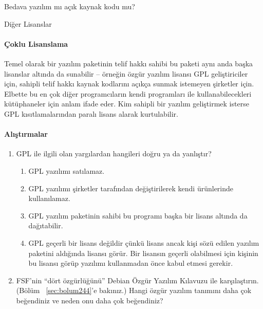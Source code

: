 \begin{section}{Bedava yazılım mı açık kaynak kodu mu?}
\begin{subsection}{Diğer Lisanslar}
\paragraph{Çoklu Lisanslama}{Temel olarak bir yazılım paketinin telif hakkı sahibi bu paketi aynı anda başka lisanslar altında da sunabilir – örneğin özgür yazılım lisansı GPL geliştiriciler için, sahipli telif hakkı kaynak kodlarını açıkça sunmak istemeyen şirketler için. Elbette bu en çok diğer programcıların kendi programları ile kullanabilecekleri kütüphaneler için anlam ifade eder. Kim sahipli bir yazılım geliştirmek isterse GPL kısıtlamalarından paralı lisans alarak kurtulabilir.}
\paragraph{{\Huge{\PencilLeftDown}}Alıştırmalar}{
\begin{enumerate}
 \item GPL ile ilgili olan yargılardan hangileri doğru ya da yanlıştır?
 \begin{enumerate}
 \item GPL yazılımı satılamaz.
 \item GPL yazılımı şirketler tarafından değiştirilerek kendi ürünlerinde kullanılamaz.
 \item GPL yazılım paketinin sahibi bu programı başka bir lisans altında da dağıtabilir.
 \item GPL geçerli bir lisans değildir çünkü lisans ancak kişi sözü edilen yazılım paketini aldığında lisansı görür. Bir lisansın geçerli olabilmesi için kişinin bu lisansı görüp yazılımı kullanmadan önce kabul etmesi gerekir.
 \end{enumerate}
 \item FSF'nin “dört özgürlüğünü” Debian Özgür Yazılım Kılavuzu ile karşılaştırın. (Bölüm ~\ref{sec:bolum244}'e bakınız.) Hangi özgür yazılım tanımını daha çok beğendiniz ve neden onu daha çok beğendiniz?
\end{enumerate}}
\end{subsection}
\end{section}
